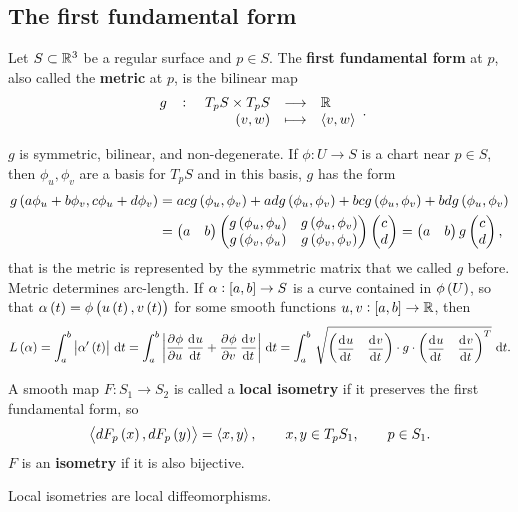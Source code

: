 \pagebreak

\subsection{The first fundamental form}

\begin{definition}
Let $ S \subset \mathbb{R}^3 $ be a regular surface and $ p \in S $. The \textbf{first fundamental form} at $ p $, also called the \textbf{metric} at $ p $, is the bilinear map
$$ \function[g]{T_pS \times T_pS}{\R}{\br{v, w}}{\abr{v, w}}. $$
\end{definition}

$ g $ is symmetric, bilinear, and non-degenerate. If $ \phi : U \to S $ is a chart near $ p \in S $, then $ \phi_u, \phi_v $ are a basis for $ T_pS $ and in this basis, $ g $ has the form
\begin{align*}
g\br{a\phi_u + b\phi_v, c\phi_u + d\phi_v}
& = acg\br{\phi_u, \phi_v} + adg\br{\phi_u, \phi_v} + bcg\br{\phi_u, \phi_v} + bdg\br{\phi_u, \phi_v} \\
& = \onebytwo{a}{b}\twobytwo{g\br{\phi_u, \phi_u}}{g\br{\phi_u, \phi_v}}{g\br{\phi_v, \phi_u}}{g\br{\phi_v, \phi_v}}\twobyone{c}{d}
= \onebytwo{a}{b}g\twobyone{c}{d},
\end{align*}
that is the metric is represented by the symmetric matrix that we called $ g $ before. Metric determines arc-length. If $ \alpha : \sbr{a, b} \to S $ is a curve contained in $ \phi\br{U} $, so that $ \alpha\br{t} = \phi\br{u\br{t}, v\br{t}} $ for some smooth functions $ u, v : \sbr{a, b} \to \R $, then
$$ L\br{\alpha} = \intd{a}{b}{\abs{\alpha'\br{t}}}{t} = \intd{a}{b}{\abs{\dpd{\phi}{u}\dod{u}{t} + \dpd{\phi}{v}\dod{v}{t}}}{t} = \intd{a}{b}{\sqrt{\onebytwo{\dod{u}{t}}{\dod{v}{t}} \cdot g \cdot \onebytwo{\dod{u}{t}}{\dod{v}{t}}^T}}{t}. $$

\begin{definition}
A smooth map $ F : S_1 \to S_2 $ is called a \textbf{local isometry} if it preserves the first fundamental form, so
$$ \abr{dF_p\br{x}, dF_p\br{y}} = \abr{x, y}, \qquad x, y \in T_pS_1, \qquad p \in S_1. $$
$ F $ is an \textbf{isometry} if it is also bijective.
\end{definition}

\begin{proposition}
Local isometries are local diffeomorphisms.
\end{proposition}



